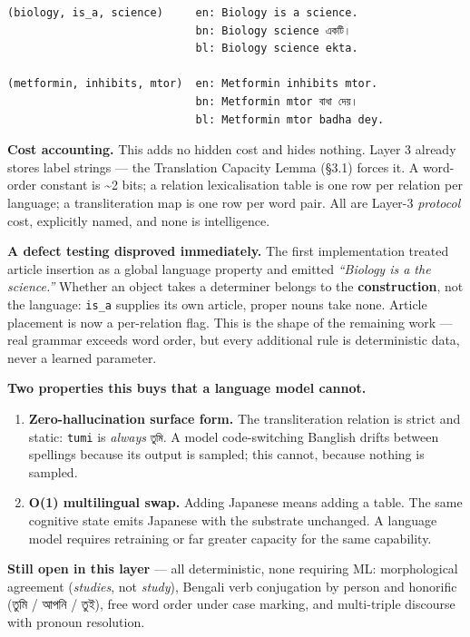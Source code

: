 \documentclass[
  11pt,
  a4paper,
]{article}
\providecommand{\tightlist}{%
  \setlength{\itemsep}{0pt}\setlength{\parskip}{0pt}}
\begin{document}
\begin{verbatim}
(biology, is_a, science)     en: Biology is a science.
                             bn: Biology science একটি।
                             bl: Biology science ekta.

(metformin, inhibits, mtor)  en: Metformin inhibits mtor.
                             bn: Metformin mtor বাধা দেয়।
                             bl: Metformin mtor badha dey.
\end{verbatim}

\textbf{Cost accounting.} This adds no hidden cost and hides nothing.
Layer 3 already stores label strings --- the Translation Capacity Lemma
(§3.1) forces it. A word-order constant is \textasciitilde2 bits; a
relation lexicalisation table is one row per relation per language; a
transliteration map is one row per word pair. All are Layer-3
\emph{protocol} cost, explicitly named, and none is intelligence.

\textbf{A defect testing disproved immediately.} The first
implementation treated article insertion as a global language property
and emitted \emph{``Biology is a the science.''} Whether an object takes
a determiner belongs to the \textbf{construction}, not the language:
\texttt{is\_a} supplies its own article, proper nouns take none. Article
placement is now a per-relation flag. This is the shape of the remaining
work --- real grammar exceeds word order, but every additional rule is
deterministic data, never a learned parameter.

\textbf{Two properties this buys that a language model cannot.}

\begin{enumerate}
\def\labelenumi{\arabic{enumi}.}
\tightlist
\item
  \textbf{Zero-hallucination surface form.} The transliteration relation
  is strict and static: \texttt{tumi} is \emph{always} \texttt{তুমি}. A
  model code-switching Banglish drifts between spellings because its
  output is sampled; this cannot, because nothing is sampled.
\item
  \textbf{O(1) multilingual swap.} Adding Japanese means adding a table.
  The same cognitive state emits Japanese with the substrate unchanged.
  A language model requires retraining or far greater capacity for the
  same capability.
\end{enumerate}

\textbf{Still open in this layer} --- all deterministic, none requiring
ML: morphological agreement (\emph{studies}, not \emph{study}), Bengali
verb conjugation by person and honorific (তুমি / আপনি / তুই), free word
order under case marking, and multi-triple discourse with pronoun
resolution.
\end{document}
